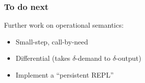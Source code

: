 \begin{frame}
\frametitle{To do next}
Further work on operational semantics:
\begin{itemize}
\item \pause Small-step, call-by-need
\item \pause Differential (takes $\delta$-demand to $\delta$-output)
\item \pause Implement a ``persistent REPL''
\end{itemize}
\end{frame}
